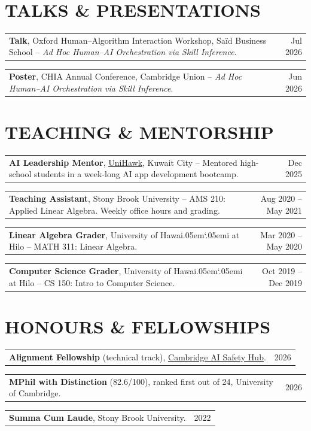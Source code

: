 \documentclass[letterpaper,11pt]{article}
\makeatletter
\newcommand{\resumeLink}[2]{\href{#1}{\uline{#2}}}
\newcommand{\resumeDatedItem}[2]{%
  \begin{tabularx}{\textwidth}{@{}X@{\hspace{10pt}}r@{}}
    {\small #1} & {\color{dark-grey}\small #2}\\
  \end{tabularx}\vspace{2pt}%
}
\makeatother
\begin{document}
\section{TALKS \& PRESENTATIONS}
\resumeDatedItem{\textbf{Talk}, Oxford Human--Algorithm Interaction Workshop, Sa\"id Business School -- \textit{Ad Hoc Human--AI Orchestration via Skill Inference}.}{Jul 2026}
\resumeDatedItem{\textbf{Poster}, CHIA Annual Conference, Cambridge Union -- \textit{Ad Hoc Human--AI Orchestration via Skill Inference}.}{Jun 2026}

\section{TEACHING \& MENTORSHIP}
\resumeDatedItem{\textbf{AI Leadership Mentor}, \resumeLink{https://alearninglab.com/conferences/ai-innovation-leadership-bootcamp-kuwait/}{UniHawk}, Kuwait City -- Mentored high-school students in a week-long AI app development bootcamp.}{Dec 2025}
\resumeDatedItem{\textbf{Teaching Assistant}, Stony Brook University -- AMS 210: Applied Linear Algebra. Weekly office hours and grading.}{Aug 2020 -- May 2021}
\resumeDatedItem{\textbf{Linear Algebra Grader}, University of Hawai\kern.05em`\kern.05emi at Hilo -- MATH 311: Linear Algebra.}{Mar 2020 -- May 2020}
\resumeDatedItem{\textbf{Computer Science Grader}, University of Hawai\kern.05em`\kern.05emi at Hilo -- CS 150: Intro to Computer Science.}{Oct 2019 -- Dec 2019}

\section{HONOURS \& FELLOWSHIPS}
\resumeDatedItem{\textbf{Alignment Fellowship} (technical track), \resumeLink{https://caish.org/}{Cambridge AI Safety Hub}.}{2026}
\resumeDatedItem{\textbf{MPhil with Distinction} (82.6/100), ranked first out of 24, University of Cambridge.}{2026}
\resumeDatedItem{\textbf{Summa Cum Laude}, Stony Brook University.}{2022}

\end{document}
